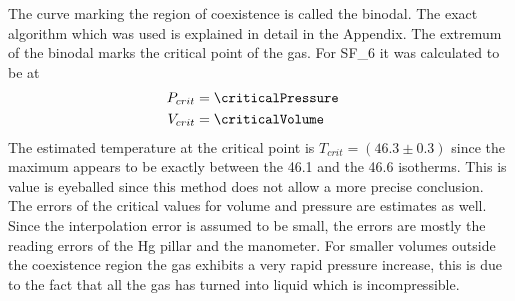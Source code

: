 \documentclass[a4paper,10pt,twocolumn]{article}
\begin{document}
    The curve marking the region of coexistence is called the binodal.
    The exact algorithm which was used is explained in detail in the Appendix. %
    The extremum of the binodal marks the critical point of the gas. 
    For SF_6\) it was calculated to be at
    \begin{align}
        P_{crit} &= \criticalPressure 
        \endline
        V_{crit} &= \criticalVolume 
        \end{align}
    The estimated temperature at the critical point is $T_{crit} = (46.3 \pm 0.3)$ since the maximum appears to be exactly between the 46.1\degree\) and the 46.6\degree\) isotherms.
    This is value is eyeballed since this method does not allow a more precise conclusion.
    The errors of the critical values for volume and pressure are estimates as well.
    Since the interpolation error is assumed to be small, the errors are mostly the reading errors of the Hg pillar and the manometer.
    For smaller volumes outside the coexistence region the gas exhibits a very rapid pressure increase, this is due to the fact that all the gas has turned into liquid which is incompressible.
\end{document}
